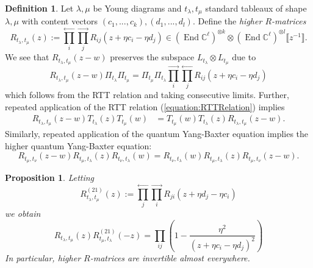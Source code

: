 \documentclass[11pt]{report}
\newtheorem{prop}[theorem]{Proposition}
\theoremstyle{definition}
\newtheorem{definition}[theorem]{Definition}
\theoremstyle{remark}
\theoremstyle{remark}
\newcommand{\End}{\operatorname{End}}
\newcommand{\C}{\mathbb{C}}
\begin{document}
\begin{definition}
Let $\lambda,\mu$ be Young diagrams and $t_\lambda,t_\mu$ standard tableaux of shape $\lambda,\mu$ with content vectors $(c_1,...,c_k),(d_1,...,d_l)$. Define the \emph{higher $R$-matrices}
\begin{equation}\label{equation:higherRMatrix}
R_{t_\lambda,t_\mu}(z) := \overset{\longleftarrow}{\prod_i} \overset{\longrightarrow}{\prod_j} R_{ij}(z+\eta c_i - \eta d_j) \in (\End \C^\ell)^{\otimes k} \otimes (\End \C^\ell)^{\otimes l}\llbracket z^{-1} \rrbracket.
\end{equation}
We see that $R_{t_\lambda,t_\mu}(z-w)$ preserves the subspace $L_{t_\lambda} \otimes L_{t_\mu}$ due to
\begin{equation*}
R_{t_\lambda,t_\mu}(z-w) \Pi_{t_\lambda} \Pi_{t_\mu} = \Pi_{t_\mu} \Pi_{t_\lambda} \overset{\longrightarrow}{\prod_i} \overset{\longleftarrow}{\prod_j} R_{ij}(z+\eta c_i - \eta d_j)
\end{equation*}
which follows from the RTT relation and taking consecutive limits.
Further, repeated application of the RTT relation (\ref{equation:RTTRelation}) implies
\begin{align*}
R_{t_\lambda,t_\mu}(z-w) T_{t_\lambda}(z) T_{t_\mu}(w) &= T_{t_\mu}(w) T_{t_\lambda}(z) R_{t_\lambda,t_\mu}(z-w).
\end{align*}
Similarly, repeated application of the quantum Yang-Baxter equation implies the higher quantum Yang-Baxter equation:
\begin{equation*}
R_{t_\mu,t_\nu}(z-w) R_{t_\mu,t_\lambda}(z) R_{t_\nu,t_\lambda}(w) =  R_{t_\nu,t_\lambda}(w) R_{t_\mu,t_\lambda}(z) R_{t_\mu,t_\nu}(z-w).
\end{equation*}
\end{definition}

\begin{prop}
Letting
\begin{equation*}
R_{t_\lambda,t_\mu}^{(21)}(z) := \overset{\longleftarrow}{\prod_j} \overset{\longrightarrow}{\prod_i} R_{ji}(z+\eta d_j - \eta c_i)
\end{equation*}
we obtain
\begin{equation*}
R_{t_\lambda,t_\mu}(z) R_{t_\mu,t_\lambda}^{(21)}(-z) = \prod_{ij} \left( 1 - \frac{\eta^2}{(z+\eta c_i-\eta d_j)^2}\right)
\end{equation*}
In particular, higher $R$-matrices are invertible almost everywhere.
\end{prop}
\end{document}
